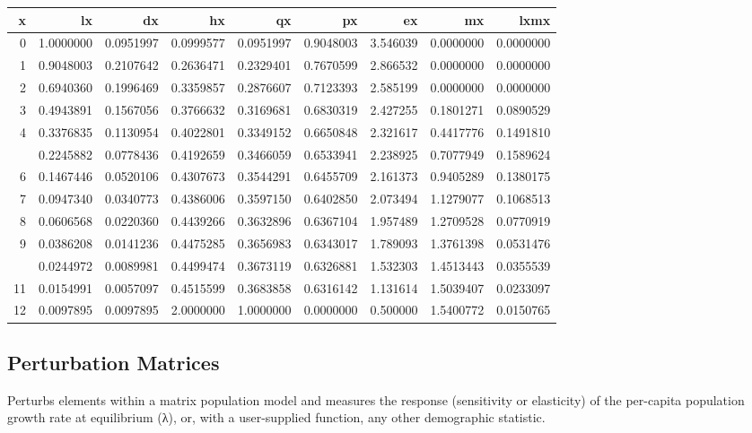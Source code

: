 \documentclass[
]{article}
\begin{document}
\begin{tabular}{rrrrrrrrr}
\toprule
x & lx & dx & hx & qx & px & ex & mx & lxmx\\
\midrule
0 & 1.0000000 & 0.0951997 & 0.0999577 & 0.0951997 & 0.9048003 & 3.546039 & 0.0000000 & 0.0000000\\
1 & 0.9048003 & 0.2107642 & 0.2636471 & 0.2329401 & 0.7670599 & 2.866532 & 0.0000000 & 0.0000000\\
2 & 0.6940360 & 0.1996469 & 0.3359857 & 0.2876607 & 0.7123393 & 2.585199 & 0.0000000 & 0.0000000\\
3 & 0.4943891 & 0.1567056 & 0.3766632 & 0.3169681 & 0.6830319 & 2.427255 & 0.1801271 & 0.0890529\\
4 & 0.3376835 & 0.1130954 & 0.4022801 & 0.3349152 & 0.6650848 & 2.321617 & 0.4417776 & 0.1491810\\
\addlinespace
5 & 0.2245882 & 0.0778436 & 0.4192659 & 0.3466059 & 0.6533941 & 2.238925 & 0.7077949 & 0.1589624\\
6 & 0.1467446 & 0.0520106 & 0.4307673 & 0.3544291 & 0.6455709 & 2.161373 & 0.9405289 & 0.1380175\\
7 & 0.0947340 & 0.0340773 & 0.4386006 & 0.3597150 & 0.6402850 & 2.073494 & 1.1279077 & 0.1068513\\
8 & 0.0606568 & 0.0220360 & 0.4439266 & 0.3632896 & 0.6367104 & 1.957489 & 1.2709528 & 0.0770919\\
9 & 0.0386208 & 0.0141236 & 0.4475285 & 0.3656983 & 0.6343017 & 1.789093 & 1.3761398 & 0.0531476\\
\addlinespace
10 & 0.0244972 & 0.0089981 & 0.4499474 & 0.3673119 & 0.6326881 & 1.532303 & 1.4513443 & 0.0355539\\
11 & 0.0154991 & 0.0057097 & 0.4515599 & 0.3683858 & 0.6316142 & 1.131614 & 1.5039407 & 0.0233097\\
12 & 0.0097895 & 0.0097895 & 2.0000000 & 1.0000000 & 0.0000000 & 0.500000 & 1.5400772 & 0.0150765\\
\bottomrule
\end{tabular}

\newpage

\hypertarget{perturbation-matrices}{%
\subsection{Perturbation Matrices}\label{perturbation-matrices}}

Perturbs elements within a matrix population model and measures the
response (sensitivity or elasticity) of the per-capita population growth
rate at equilibrium (λ), or, with a user-supplied function, any other
demographic statistic.
\end{document}
